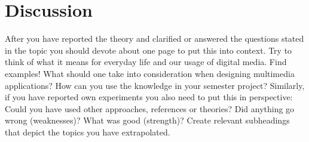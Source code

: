 \documentclass[11pt,a4paper,oneside,table,xcdraw]{article}
\begin{document}
	\section{Discussion}
	After you have reported the theory and clarified or answered the questions stated in
	the topic you should devote about one page to put this into context. Try to think of
	what it means for everyday life and our usage of digital media. Find examples! What
	should one take into consideration when designing multimedia applications? How can
	you use the knowledge in your semester project?
	Similarly, if you have reported own experiments you also need to put this in
	perspective: Could you have used other approaches, references or theories? Did
	anything go wrong (weaknesses)? What was good (strength)? Create relevant
	subheadings that depict the topics you have extrapolated. 


	
\end{document}
